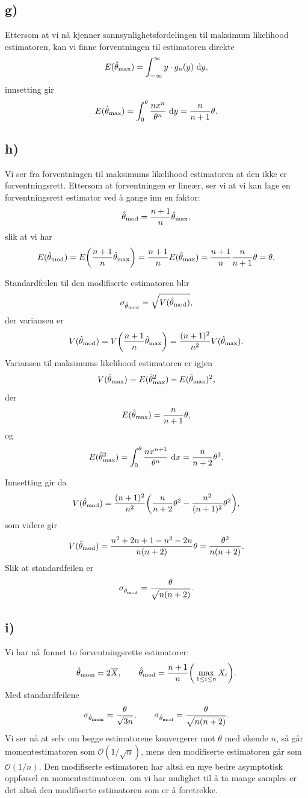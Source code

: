 \documentclass[a4paper, 11pt, titlepage, english]{article}
\renewcommand{\d}{{\rm d}}
\begin{document}
\subsection*{g)}
Ettersom at vi nå kjenner sannsynlighetsfordelingen til maksimum likelihood estimatoren, kan vi finne forventningen til estimatoren direkte
$$E(\hat{\theta}_{\rm max}) = \int_{-\infty}^{\infty} y \cdot g_n(y) \ \d y,$$
innsetting gir
$$E(\hat{\theta}_{\rm max}) = \int_0^\theta \frac{nx^n}{\theta^n} \ \d y = \frac{n}{n+1}\theta.$$

\subsection*{h)}
Vi ser fra forventningen til maksimums likelihood estimatoren at den ikke er forventningsrett. Ettersom at forventningen er lineær, ser vi at vi kan lage en forventningsrett estimator ved å gange inn en faktor:
$$\hat{\theta}_{\rm mod} = \frac{n+1}{n}\hat{\theta}_{\rm max},$$
slik at vi har
$$E(\hat{\theta}_{\rm mod}) = E\bigg(\frac{n+1}{n}\hat{\theta}_{\rm max}\bigg) = \frac{n+1}{n} E(\hat{\theta}_{\rm max}) = \frac{n+1}{n}\frac{n}{n+1}\theta = \theta.$$

Standardfeilen til den modifiserte estimatoren blir
$$\sigma_{\hat{\theta}_{\rm mod}} = \sqrt{V(\hat{\theta}_{\rm mod})},$$
der variansen er
$$V(\hat{\theta}_{\rm mod}) = V\bigg(\frac{n+1}{n}\hat{\theta}_{\rm max}\bigg) = \frac{(n+1)^2}{n^2}V(\hat{\theta}_{\rm max}).$$
Variansen til maksimums likelihood estimatoren er igjen
$$V(\hat{\theta}_{\rm max}) = E(\hat{\theta}_{\rm max}^2) - E(\hat{\theta}_{\rm max})^2,$$
der 
$$E(\hat{\theta}_{\rm max}) = \frac{n}{n+1}\theta,$$
og 
$$E(\hat{\theta}_{\rm max}^2) = \int_0^\theta \frac{nx^{n+1}}{\theta^n} \ \d x = \frac{n}{n+2}\theta^2.$$

Innsetting gir da
$$V(\hat{\theta}_{\rm mod}) = \frac{(n+1)^2}{n^2} \bigg(\frac{n}{n+2}\theta^2 - \frac{n^2}{(n+1)^2}\theta^2\bigg),$$
som videre gir 
$$V(\hat{\theta}_{\rm mod}) = \frac{n^2+2n+1 - n^2 - 2n}{n(n+2)}\theta = \frac{\theta^2}{n(n+2)}.$$
Slik at standardfeilen er
$$\sigma_{\hat{\theta}_{\rm mod}} = \frac{\theta}{\sqrt{n(n+2)}}.$$

\subsection*{i)}
Vi har nå funnet to forventningsrette estimatorer:
$$\hat{\theta}_{\rm mom} = 2\overline{X}, \qquad \hat{\theta}_{\rm mod} = \frac{n+1}{n}\bigg(\max_{1\leq i\leq n} X_i\bigg).$$
Med standardfeilene
$$\sigma_{\hat{\theta}_{\rm mom}} = \frac{\theta}{\sqrt{3n}}, \qquad \sigma_{\hat{\theta}_{\rm mod}} = \frac{\theta}{\sqrt{n(n+2)}}.$$
Vi ser nå at selv om begge estimatorene konvergerer mot $\theta$ med økende $n$, så går momentestimatoren som $\mathcal{O}(1/\sqrt{n})$, mens den modifiserte estimatoren går som $\mathcal{O}(1/n)$. Den modifiserte estimatoren har altså en mye bedre asymptotisk oppførsel en momentestimatoren, om vi har mulighet til å ta mange samples er det altså den modifiserte estimatoren som er å foretrekke.
\end{document}
